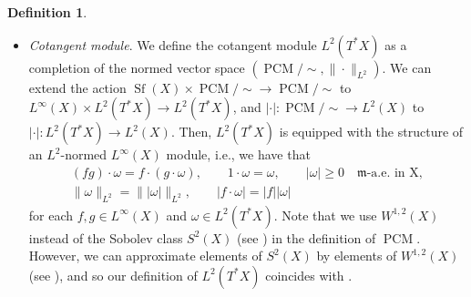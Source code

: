 \documentclass[pdftex]{sigma}
\numberwithin{equation}{section}
\theoremstyle{definition}
\newtheorem{Def}[Thm]{Definition}
\newcommand{\PCM}{\operatorname{PCM}}
\newcommand{\Sf}{\operatorname{Sf}}
\newcommand{\R}{\mathbb{R}}
\newcommand{\Z}{\mathbb{Z}}
\newcommand{\mf}{\mathfrak{m}}
\begin{document}
\begin{Def}
\begin{itemize}
\[
|D (f_i-g_j)|=0 \text{ $\mf$-a.e.\ in $A_i\cap B_j$ for each $i,j\in\Z_{>0}$}.
\]
We define
\begin{gather*}
|\cdot|\colon \PCM/{\sim} \to L^2(X),\qquad
[\{(f_i,A_i)\}]\mapsto \sum_{i=1}^\infty \chi_{A_i}|D f_i|,
\\
\|\cdot\|_{L^2}\colon \PCM/{\sim} \to [0,\infty),\quad [\{(f_i,A_i)\}]\mapsto\big\||[\{(f_i,A_i)\}]|\big\|_{L^2}\!
=\!\bigg(\!\sum_{i}\! \int_{A_i}\!\! |D f_i|^2\,{\rm d}\mf\!\bigg)^{1/2}\!\!\!,
\end{gather*}
where $\chi_{A_i}$ denotes the characteristic function.
Then, $(\PCM/{\sim},\|\cdot\|_{L^2})$ is naturally equipped with the structure of the normed vector space.
Moreover, we define
\[
\bigg(\sum_{i=1}^\infty a_i \chi_{A_i}\bigg)\cdot [\{(f_i,B_i)\}]:=[\{(a_i f_j,A_i\cap B_j)\}_{i,j}]
\]
for each $\sum_{i=1}^\infty a_i \chi_{A_i}\in \Sf(X)$ and $[\{(f_i,B_i)\}]\in \PCM/{\sim}$, where $\Sf(X)$ is defined by
\[
\Sf(X):=\left\{\sum_{i=1}^\infty a_i \chi_{A_i}\colon
\begin{array}{@{}l@{}}\text{$\{A_i\}_{i=1}^\infty$ is a pairwise disjoint family of Borel subsets of $X$}\\
\text{with $\bigcup_{i} A_i=X$, $a_i\in \R$ with $\sup_{i} |a_i|<\infty$}
\end{array} \right\} .
\]
Then, we have
$\|f\cdot \omega\|_{L^2}\leq \|f\|_{L^\infty}\|\omega\|_{L^2}$
for each $f\in\Sf(X)$ and $\omega\in \PCM/{\sim}$.
\item \emph{Cotangent module}. We define the cotangent module $L^2(T^\ast X)$ as a completion of the normed vector space $(\PCM/{\sim},\|\cdot\|_{L^2})$.
We can extend the action $\Sf(X)\times \PCM/{\sim}\to\PCM/{\sim}$ to $L^\infty(X)\times L^2(T^\ast X)\to L^2(T^\ast X)$, and
$|\cdot|\colon \PCM/{\sim} \to L^2(X)$ to $|\cdot|\colon L^2(T^\ast X) \to L^2(X)$.
Then, $L^2(T^\ast X)$ is equipped with the structure of an $L^2$-normed $L^\infty(X)$ module, i.e., we have that
\begin{gather*}
(f g)\cdot \omega=f\cdot (g\cdot \omega),\qquad
1\cdot \omega=\omega,\qquad
|\omega|\geq 0\quad \text{$\mf$-a.e.\ in X},
\\
\|\omega\|_{L^2}=\big\||\omega|\big\|_{L^2},\qquad
|f\cdot \omega|=|f||\omega|
\end{gather*}
for each $f,g\in L^\infty(X)$ and $\omega\in L^2(T^\ast X)$.
Note that we use $W^{1,2}(X)$ instead of the Sobolev class $S^2(X)$ (see \cite[Definition~2.1.4]{Gig}) in the definition of $\PCM$.
However, we can approximate elements of $S^2(X)$ by elements of $W^{1,2}(X)$ (see \cite[Proposition~2.2.5]{Gig}), and so our definition of $L^2(T^\ast X)$ coincides with \cite[Definition~2.2.1]{Gig}.

\end{itemize}
\end{Def}
\end{document}
